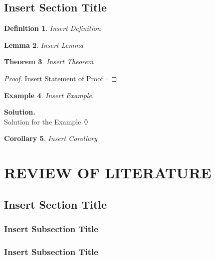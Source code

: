 \documentclass[12pt,a4paper,oneside]{book}
\theoremstyle{plain}
\newtheorem{thm}{Theorem}[chapter]
\newtheorem{lem}[thm]{Lemma}
\newtheorem{cor}[thm]{Corollary}
\newtheorem{ex}[thm]{Example}
\newtheorem{de}[thm]{Definition}
\numberwithin{equation}{chapter} \DeclareMathOperator{\Var}{Var}
\newcommand*{\QEDA}{\hfill\ensuremath{\large{\lozenge}}}
\newcommand*{\QEDAa}{\hfill\ensuremath{\square}}
\begin{document}
\section{Insert Section Title}\label{Sec2.1}

\begin{de}\label{def1}
	Insert Definition
\end{de}

\vspace{1cm}

\begin{lem}\label{lem1}
	Insert Lemma
\end{lem}

\vspace{1cm}

\begin{thm}\label{thm1}
	Insert Theorem
\end{thm}

\noindent\begin{proof}
	Insert Statement of Proof
	\QEDAa
\end{proof}

\vspace{1cm}

\begin{ex}\label{ex1}
	Insert Example.
\end{ex}
\noindent\textbf{Solution.}\\
Solution for the Example \QEDA

\vspace{1cm}

\begin{cor}
	Insert Corollary
\end{cor}


\chapter*{REVIEW OF LITERATURE}
\section{Insert Section Title}\label{Sec3.1}
\subsection{Insert Subsection Title}\label{sub3.1.1}
\subsection{Insert Subsection Title}\label{sub3.1.2}
\end{document}
